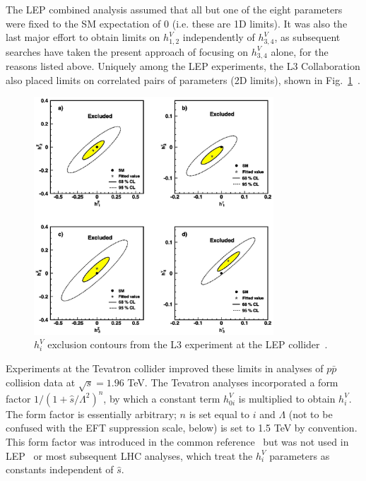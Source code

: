 \documentclass[oneside, letterpaper, 12pt, oldfontcommands]{memoir}
\begin{document}
The LEP combined analysis assumed that all but one of the eight parameters were fixed to the SM expectation of 0 (i.e. these are 1D limits).
It was also the last major effort to obtain limits on $h_{1,2}^{V}$ independently of $h_{3,4}^{V}$,
as subsequent searches have taken the present approach of focusing on $h_{3,4}^{V}$ alone, for the reasons listed above.
Uniquely among the LEP experiments, the L3 Collaboration also placed limits on correlated pairs of parameters (2D limits), shown in Fig.~\ref{fig:L3_atgc_contours}~\cite{ref:j.physletb.2004.07.002}.

\begin{figure}[hbtp]
  \begin{center}
    \includegraphics[width=0.8\textwidth]{Figures/L3_atgc_contours.jpg}
    \caption{
      $h_{i}^{V}$ exclusion contours from the L3 experiment at the LEP collider~\cite{ref:j.physletb.2004.07.002}.
    }
    \label{fig:L3_atgc_contours}
  \end{center}
\end{figure}

Experiments at the Tevatron collider improved these limits in analyses of $p\bar{p}$ collision data at $\sqrt{s} = 1.96$ TeV.
The Tevatron analyses incorporated a form factor $1 / (1 + \hat{s}/\Lambda^{2})^{n}$, by which a constant term $h_{0i}^{V}$ is
multiplied to obtain $h_{i}^{V}$.
The form factor is essentially arbitrary; $n$ is set equal to $i$ and $\Lambda$ (not to be confused with the EFT suppression scale, below)
is set to 1.5 TeV by convention. This form factor was introduced in the common reference~\cite{ref:PhysRevD.47.4889} but was not used in LEP~\cite{ref:j.physrep.2013.07.004}
or most subsequent LHC analyses, which treat the $h_{i}^{V}$ parameters as constants independent of $\hat{s}$.
\end{document}
